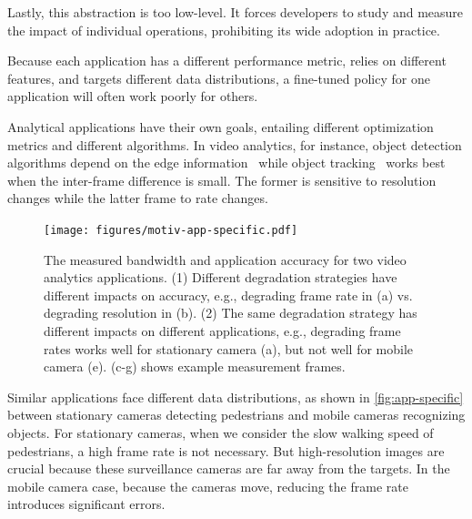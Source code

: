 Lastly, this abstraction is too low-level. It forces developers to study and
measure the impact of individual operations, prohibiting its wide adoption in
practice.

 Because each
application has a different performance metric, relies on different features,
and targets different data distributions, a fine-tuned policy for one
application will often work poorly for others. 

Analytical applications have their own goals, entailing different optimization
metrics and different algorithms. In video analytics, for instance, object
detection algorithms depend on the edge
information~\cite{canny1986computational, lowe2004distinctive, viola2001rapid}
while object tracking~\cite{allen2004object} works best when the inter-frame
difference is small. The former is sensitive to resolution changes while the
latter frame to rate changes.

\begin{figure}
  \centering
  \texttt{[image: figures/motiv-app-specific.pdf]}
  \caption{The measured bandwidth and application accuracy for two video
    analytics applications.  (1) Different degradation strategies have different
    impacts on accuracy, e.g., degrading frame rate in (a) vs.\,degrading
    resolution in (b).  (2) The same degradation strategy has different impacts
    on different applications, e.g., degrading frame rates works well for
    stationary camera (a), but not well for mobile camera (e). (c-g) shows
    example measurement frames. }
  \label{fig:app-specific}
\end{figure}

Similar applications face different data distributions, as shown in
\autoref{fig:app-specific} between stationary cameras detecting pedestrians and
mobile cameras recognizing objects. For stationary cameras, when we consider the
slow walking speed of pedestrians, a high frame rate is not necessary. But
high-resolution images are crucial because these surveillance cameras are far
away from the targets. In the mobile camera case, because the cameras move,
reducing the frame rate introduces significant errors.

